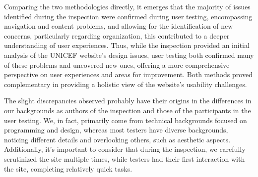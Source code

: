 Comparing the two methodologies directly, it emerges that the majority of issues identified during the inspection were confirmed during user testing, encompassing navigation and content problems, and allowing for the identification of new concerns, particularly regarding organization, this contributed to a deeper understanding of user experiences. Thus, while the inspection provided an initial analysis of the UNICEF website's design issues, user testing both confirmed many of these problems and uncovered new ones, offering a more comprehensive perspective on user experiences and areas for improvement. Both methods proved complementary in providing a holistic view of the website's usability challenges.
\newline

The slight discrepancies observed probably have their origins in the differences in our backgrounds as authors of the inspection and those of the participants in the user testing. We, in fact, primarily come from technical backgrounds focused on programming and design, whereas most testers have diverse backgrounds, noticing different details and overlooking others, such as aesthetic aspects. Additionally, it's important to consider that during the inspection, we carefully scrutinized the site multiple times, while testers had their first interaction with the site, completing relatively quick tasks.

